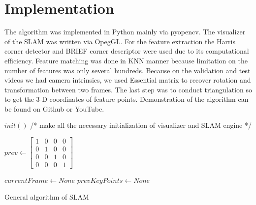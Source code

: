 \pagebreak
\section{Implementation}

The algorithm was implemented in Python mainly via pyopencv. The visualizer of the SLAM was written via OpegGL. For the feature extraction the Harris corner detector and BRIEF corner descriptor were used due to its computational efficiency. Feature matching was done in KNN manner because limitation on the number of features was only several hundreds. Because on the validation and test videos we had camera intrinsics, we used Essential matrix to recover rotation and transformation between two frames. The last step was to conduct triangulation so to get the 3-D coordinates of feature points. Demonstration of the algorithm can be found on Github or YouTube.

\vspace{5mm} %

\begin{algorithm}[H]

	$init()$ /* make all the necessary initialization of visualizer and SLAM engine */ \;
	
	$prev \gets \begin{bmatrix}
	    1 & 0 & 0 & 0 \\ 0 & 1 & 0 & 0 \\ 0 & 0 & 1 & 0 \\ 0 & 0 & 0 & 1
	\end{bmatrix}$\;
	
	$currentFrame \gets None$\;
	$prevKeyPoints \gets None$\;
	
	\caption{General algorithm of SLAM}
\end{algorithm}

